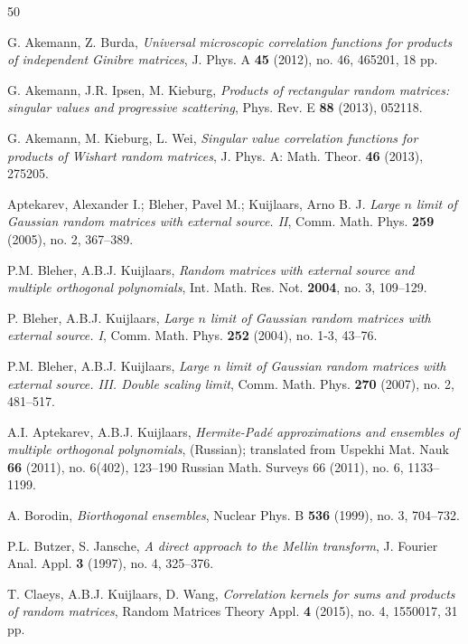 \documentclass[a4paper,12pt,oneside]{article}
\theoremstyle{definition}
\begin{document}
\begin{thebibliography}{50}

G. Akemann, Z. Burda,
\textit{Universal microscopic correlation functions for products of independent Ginibre matrices}, 
J. Phys. A \textbf{45} (2012), no. 46, 465201, 18 pp.

G. Akemann, J.R. Ipsen, M. Kieburg, 
\textit{Products of rectangular random matrices: singular values and progressive scattering}, 
Phys. Rev. E \textbf{88} (2013), 052118.

G. Akemann, M. Kieburg, L. Wei, 
\textit{Singular value correlation functions for products of Wishart random matrices}, 
J. Phys. A: Math. Theor. \textbf{46} (2013), 275205.

Aptekarev, Alexander I.; Bleher, Pavel M.; Kuijlaars, Arno B. J. \textit{Large $n$ limit of Gaussian random matrices with external source. II}, Comm. Math. Phys. \textbf{259} (2005), no. 2, 367--389.

P.M. Bleher, A.B.J. Kuijlaars, \textit{Random matrices with external source and multiple orthogonal polynomials}, Int. Math. Res. Not. \textbf{2004}, no. 3, 109--129. 

P. Bleher, A.B.J. Kuijlaars, \textit{Large $n$ limit of Gaussian random matrices with external source. I}, Comm. Math. Phys. \textbf{252} (2004), no. 1-3, 43--76. 

P.M. Bleher, A.B.J. Kuijlaars, \textit{Large $n$ limit of Gaussian random matrices with external source. III. Double scaling limit}, Comm. Math. Phys. \textbf{270} (2007), no. 2, 481--517.

A.I. Aptekarev, A.B.J. Kuijlaars,
\textit{Hermite-Padé approximations and ensembles of multiple orthogonal polynomials}, 
(Russian); translated from Uspekhi Mat. Nauk \textbf{66} (2011), no. 6(402), 123--190 Russian Math. Surveys 66 (2011), no. 6, 1133--1199.

A. Borodin, 
\textit{Biorthogonal ensembles}, 
Nuclear Phys. B \textbf{536} (1999), no. 3, 704--732.

P.L. Butzer, S. Jansche,
\textit{A direct approach to the Mellin transform},
J. Fourier Anal. Appl. \textbf{3} (1997), no. 4, 325--376.

T. Claeys, A.B.J. Kuijlaars, D. Wang,
\textit{Correlation kernels for sums and products of random matrices},
Random Matrices Theory Appl. \textbf{4} (2015), no. 4, 1550017, 31 pp.


\end{thebibliography}
\end{document}
